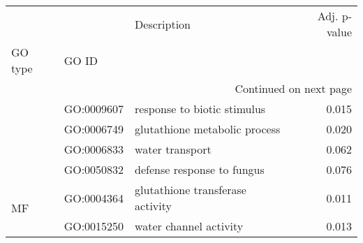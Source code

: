\begin{longtable}{lllr}
\toprule
   &            &                       Description &  Adj. p-value \\
GO type & GO ID &                                   &               \\
\midrule
\endhead
\midrule
\multicolumn{4}{r}{{Continued on next page}} \\
\midrule
\endfoot

\bottomrule
\endlastfoot
\multirow{4}{*}{BP} & GO:0009607 &       response to biotic stimulus &         0.015 \\
   & GO:0006749 &     glutathione metabolic process &         0.020 \\
   & GO:0006833 &                   water transport &         0.062 \\
   & GO:0050832 &        defense response to fungus &         0.076 \\
\cline{1-4}
\multirow{2}{*}{MF} & GO:0004364 &  glutathione transferase activity &         0.011 \\
   & GO:0015250 &            water channel activity &         0.013 \\
\end{longtable}

